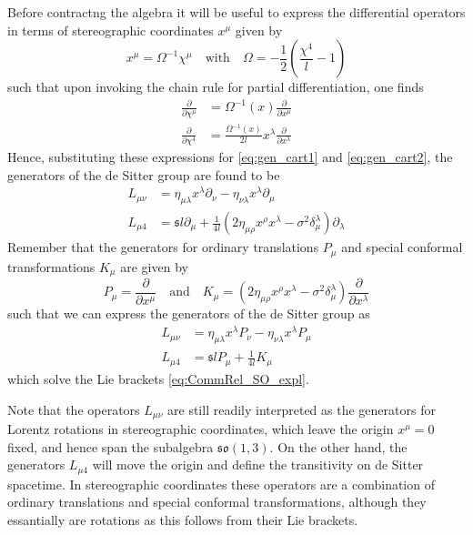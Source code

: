 \documentclass[10pt]{article}
\newcommand{\mfrak}{\mathfrak}
\newcommand{\mrm}{\mathrm}
\newcommand{\pd}{\partial}
\newcommand{\sfr}{\mathfrak{s}}
\newcommand{\blankline}{\vspace{\baselineskip}}
\begin{document}
Before contractng the algebra it will be useful to express the differential 
operators in terms of stereographic coordinates $x^\mu$ given by
\begin{equation}
  x^\mu = \Omega^{-1}\chi^\mu \quad \mrm{with} \quad \Omega = -\frac{1}{2} 
  \left( \frac{\chi^4}{l} - 1 \right)
\end{equation}
such that upon invoking the chain rule for partial differentiation, one finds
\begin{align}
  \frac{\pd}{\pd \chi^\mu} &= \Omega^{-1}(x)\frac{\pd}{\pd x^\mu} \\
  \frac{\pd}{\pd \chi^4} &= \frac{\Omega^{-1}(x)}{2l} x^\lambda
  \frac{\pd}{\pd x^\lambda}
\end{align}
Hence, substituting these expressions for \eqref{eq:gen_cart1} and 
\eqref{eq:gen_cart2}, the generators of the de Sitter group are found to be
\begin{align}
  L_{\mu\nu} &= \eta_{\mu\lambda} x^\lambda \pd_\nu - \eta_{\nu\lambda} 
  x^{\lambda} \pd_\mu \\
  L_{\mu 4} &= \sfr l \pd_\mu + \frac{1}{4l} \left(2\eta_{\mu\rho} x^\rho 
  x^\lambda - \sigma^2 \delta_\mu^\lambda \right) \pd_\lambda
\end{align}
Remember that the generators for ordinary translations $P_\mu$ and special 
conformal transformations $K_\mu$ are given by
\begin{equation}
  P_\mu = \frac{\pd}{\pd x^\mu} \quad \mrm{and} \quad
  K_\mu = \left(2\eta_{\mu\rho} x^\rho x^\lambda - \sigma^2 \delta_\mu^\lambda 
  \right) \frac{\pd}{\pd x^\lambda}
\end{equation}
such that we can express the generators of the de Sitter group as
\begin{align}
  L_{\mu\nu} &= \eta_{\mu\lambda} x^\lambda P_\nu - \eta_{\nu\lambda} 
  x^{\lambda} P_\mu \\
  L_{\mu 4} &= \sfr l P_\mu + \frac{1}{4l} K_\mu
\end{align}
which solve the Lie brackets \eqref{eq:CommRel_SO_expl}.

Note that the operators $L_{\mu\nu}$ are still readily interpreted as the 
generators for Lorentz rotations in stereographic coordinates, which leave the 
origin $x^\mu=0$ fixed, and hence span the subalgebra $\mfrak{so}(1,3)$. On the 
other hand, the generators $L_{\mu4}$ will move the origin and define the 
transitivity on de Sitter spacetime. In stereographic coordinates these 
operators are a combination of ordinary translations and special conformal 
transformations, although they essantially are rotations as this follows from 
their Lie brackets.
\blankline
\end{document}
